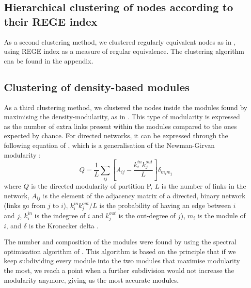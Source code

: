 \documentclass[twocolumn]{article}
\begin{document}
	\subsection*{Hierarchical clustering of nodes according to their REGE index}
	As a second clustering method, we clustered regularly equivalent nodes as in \citet{Luczkovich2003}, using REGE index as a measure of regular equivalence. The clustering algorithm cna be found in the appendix.
	\subsection*{Clustering of density-based modules}
		\par
		As a third clustering method, we clustered the nodes inside the modules found by maximising the density-modularity, as in \citet{Guimera2010}. This type of modularity is expressed as the number of extra links present within the modules compared to the ones expected by chance. For directed networks, it can be expressed through the following equation of \citet{Arenas2007}, which is a generalisation of the Newman-Girvan modularity \citep{Newman2004}:
			\begin{equation}
				Q=\frac{1}{L}\sum\limits_{ij}[A_{ij}-\frac{k_i^{in}k_j^{out}}{L}]\delta_{m_im_j} \label{eqn:modularitydensity}
			\end{equation}
		where $Q$ is the directed modularity of partition P, $L$ is the number of links in the network, $A_{ij}$ is the element of the adjacency matrix of a directed, binary network (links go from $j$ to $i$), $k_i^{in}k_j^{out}/L$ is the probability of having an edge between $i$ and $j$, $k^{in}_i$ is the indegree of $i$ and $k^{out}_j$ is the out-degree of $j$), $ m_i$ is the module of $i$, and $\delta$ is the Kronecker delta \citep{Kozen2007}.
		\par
		The number and composition of the modules were found by using the spectral optimisation algorithm of \citet{Leicht2008}. This algorithm is based on the principle that if we keep subdividing every module into the two modules that maximise modularity the most, we reach a point when a further subdivision would not increase the modularity anymore, giving us the most accurate modules.
\end{document}
